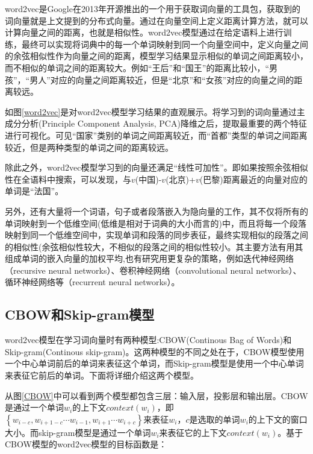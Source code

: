 word2vec\cite{mikolov2013distributed}是Google在2013年开源推出的一个用于获取词向量的工具包，获取到的词向量就是上文提到的分布式向量。通过在向量空间上定义距离计算方法，就可以计算向量之间的距离，也就是相似性。word2vec模型通过在给定语料上进行训练，最终可以实现将词典中的每一个单词映射到同一个向量空间中，定义向量之间的余弦相似性作为向量之间的距离，模型学习结果显示相似的单词之间距离较小，而不相似的单词之间的距离较大。例如“王后”和“国王”的距离比较小，“男孩”，“男人”对应的向量之间距离较近，但是“北京”和“女孩”对应的向量之间的距离较远。

如图\ref{word2vec}是对word2vec模型学习结果的直观展示。将学习到的词向量通过主成分分析(Principle Component Analysis, PCA)降维之后，提取最重要的两个特征进行可视化。可见“国家”类别的单词之间距离较近，而“首都”类型的单词之间距离较近，但是两种类型的单词之间的距离较远。

除此之外，word2vec模型学习到的向量还满足“线性可加性”。即如果按照余弦相似性在全语料中搜索，可以发现，与$v$(中国)-$v$(北京)+$v$(巴黎)距离最近的向量对应的单词是“法国”。

另外，还有大量将一个词语，句子或者段落嵌入为隐向量的工作，其不仅将所有的单词映射到一个低维空间(低维是相对于词典的大小而言的)中，而且将每一个段落映射到同一个低维空间中，实现单词和段落的同步表征，最终实现相似的段落之间的相似性(余弦相似性较大，不相似的段落之间的相似性较小。其主要方法有用其组成单词的嵌入向量的加权平均\cite{mitchell2010composition,iyyer2015deep},也有研究用更复杂的策略，例如迭代神经网络（recursive neural networks）\cite{socher2011dynamic}、卷积神经网络（convolutional neural networks）\cite{kalchbrenner2014convolutional}、循环神经网络等（recurrent neural networks）\cite{tai2015improved}。

\subsection{CBOW和Skip-gram模型}

word2vec模型在学习词向量时有两种模型:CBOW(Continous Bag of Words)和Skip-gram(Continous skip-gram)。这两种模型的不同之处在于，CBOW模型使用一个中心单词前后的单词来表征这个单词，而Skip-gram模型是使用一个中心单词来表征它前后的单词。下面将详细介绍这两个模型。

从图\ref{CBOW}中可以看到两个模型都包含三层：输入层，投影层和输出层。CBOW
是通过一个单词$w_i$的上下文$context(w_i)$，即$\left\{ w _ { i - c } , w _ { i + 1 - c } \cdots w _ { i - 1 } , w _ { i + 1 } \cdots w _ { i + c }\right\}$来表征$w_i$，$c$是选取的单词$w_i$的上下文的窗口大小。而skip-gram模型是通过一个单词$w_i$来表征它的上下文$context(w_i)$。基于CBOW模型的word2vec模型的目标函数是：

